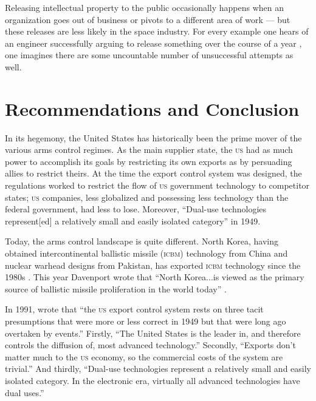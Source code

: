 \documentclass[preprint,twocolumn,5p]{elsarticle}
\begin{document}
Releasing intellectual property to the public occasionally happens when an organization goes out of business or pivots to a different area of work --- but these releases are less likely in the space industry. For every example one hears of an engineer successfully arguing to release something over the course of a year \citep{Scoles2017}, one imagines there are some uncountable number of unsuccessful attempts as well.

\section{Recommendations and Conclusion}
In its hegemony, the United States has historically been the prime mover of the various arms control regimes. As the main supplier state, the \textsc{us} had as much power to accomplish its goals by restricting its own exports as by persuading allies to restrict theirs. At the time the export control system was designed, the regulations worked to restrict the flow of \textsc{us} government technology to competitor states; \textsc{us} companies, less globalized and possessing less technology than the federal government, had less to lose. Moreover, ``Dual-use technologies represent[ed] a relatively small and easily isolated category'' in 1949. \citep{Kuttner1991}

Today, the arms control landscape is quite different. North Korea, having obtained intercontinental ballistic missile (\textsc{icbm}) technology from China and nuclear warhead designs from Pakistan, has exported \textsc{icbm} technology since the 1980s \citep{Squassoni2006}. This year Davenport wrote that ``North Korea...is viewed as the primary source of ballistic missile proliferation in the world today'' \citep{Davenport2021}.

In 1991, \citet{Kuttner1991} wrote that ``the \textsc{us} export control system rests on three tacit presumptions that were more or less correct in 1949 but that were long ago overtaken by events.'' Firstly, ``The United States is the leader in, and therefore controls the diffusion of, most advanced technology.'' Secondly, ``Exports don’t matter much to the \textsc{us} economy, so the commercial costs of the system are trivial.'' And thirdly, ``Dual-use technologies represent a relatively small and easily isolated category. In the electronic era, virtually all advanced technologies have dual uses.''
\end{document}
